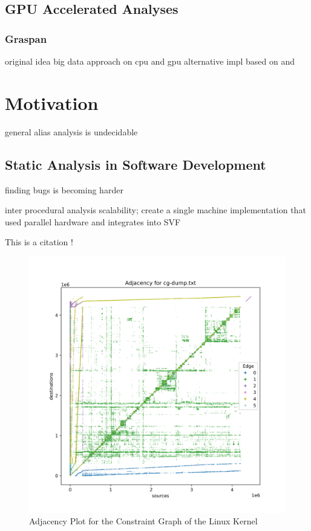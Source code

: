 \subsection{GPU Accelerated Analyses}
\subsubsection{Graspan}
original idea \cite{zheng2008demand} big data approach on cpu \cite{wang2017graspan} and gpu \cite{zuo2021systemizing} alternative impl \cite{gu2020towards} based on \cite{mendez2012gpu} and \cite{mendez2010parallel}
\section{Motivation}
general alias analysis is undecidable
\subsection{Static Analysis in Software Development}
finding bugs is becoming harder

inter procedural analysis scalability; create a single machine implementation that used parallel hardware and integrates into SVF


This is a citation \cite{juliani2018unity}!

\begin{figure}
    \centering
    \includegraphics[width=1.\textwidth]{img/linux-consg-min.png}
    \caption{Adjacency Plot for the Constraint Graph of the Linux Kernel}
    \label{fig:linux-consg}
\end{figure}


